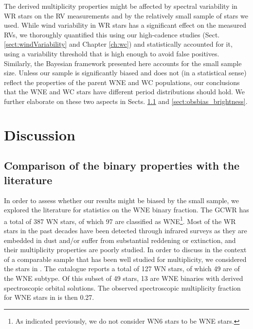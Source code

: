The derived multiplicity properties might be affected by spectral variability in WR stars on the RV measurements and by the relatively small sample of stars we used. While wind variability in WR stars has a significant effect on the measured RVs, we thoroughly quantified this using our high-cadence studies (Sect. \ref{sect:windVariability} and Chapter \ref{ch:wc}) and statistically accounted for it, using a variability threshold that is high enough to avoid false positives. Similarly, the Bayesian framework presented here accounts for the small sample size. Unless our sample is significantly biased and does not (in a statistical sense) reflect the properties of the parent WNE and WC populations, our conclusions that the WNE and WC stars have different period distributions should hold. We further elaborate on these two aspects in Sects. \ref{sect:literature} and \ref{sect:obsbias_brightness}.

%
\section{Discussion}\label{sect:evolution}

\subsection{Comparison of the binary properties with the literature} \label{sect:literature}

In order to assess whether our results might be biased by the small sample, we explored the literature for statistics on the WNE binary fraction. The GCWR has a total of 387 WN stars, of which 97 are classified as WNE\footnote{As indicated previously, we do not consider WN6 stars to be WNE stars.}. Most of the WR stars in the past decades have been detected through infrared surveys as they are embedded in dust and/or suffer from substantial reddening or extinction, and their multiplicity properties are poorly studied. In order to discuss \fobsWNE{} in the context of a comparable sample that has been well studied for multiplicity, we considered the stars in . The catalogue reports a total of 127 WN stars, of which 49 are of the WNE subtype. Of this subset of 49 stars, 13 are WNE binaries with derived spectroscopic orbital solutions. The observed spectroscopic multiplicity fraction for WNE stars in  is then 0.27. 


